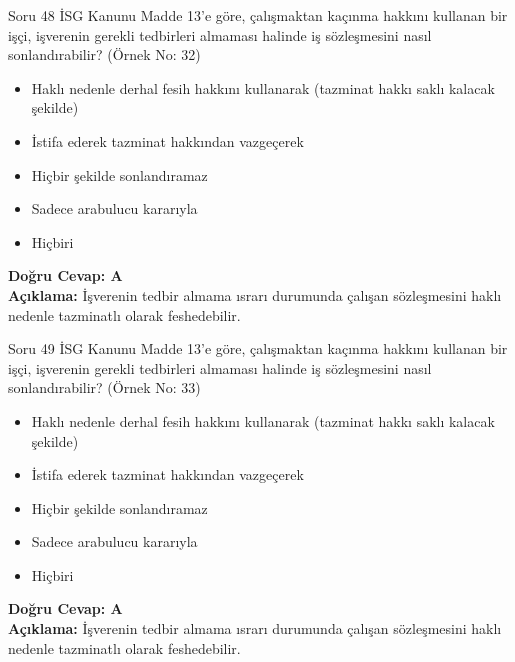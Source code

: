 \documentclass[12pt,a4paper]{article}
\begin{document}
\begin{testcard}{Soru 48}
    İSG Kanunu Madde 13'e göre, çalışmaktan kaçınma hakkını kullanan bir işçi, işverenin gerekli tedbirleri almaması halinde iş sözleşmesini nasıl sonlandırabilir? (Örnek No: 32)
    \begin{itemize}
        \item[A)] Haklı nedenle derhal fesih hakkını kullanarak (tazminat hakkı saklı kalacak şekilde)
        \item[B)] İstifa ederek tazminat hakkından vazgeçerek
        \item[C)] Hiçbir şekilde sonlandıramaz
        \item[D)] Sadece arabulucu kararıyla
        \item[E)] Hiçbiri
    \end{itemize}
    \tcblower
    \textbf{Doğru Cevap: A} \\
    \textbf{Açıklama:} İşverenin tedbir almama ısrarı durumunda çalışan sözleşmesini haklı nedenle tazminatlı olarak feshedebilir.
\end{testcard}

\begin{testcard}{Soru 49}
    İSG Kanunu Madde 13'e göre, çalışmaktan kaçınma hakkını kullanan bir işçi, işverenin gerekli tedbirleri almaması halinde iş sözleşmesini nasıl sonlandırabilir? (Örnek No: 33)
    \begin{itemize}
        \item[A)] Haklı nedenle derhal fesih hakkını kullanarak (tazminat hakkı saklı kalacak şekilde)
        \item[B)] İstifa ederek tazminat hakkından vazgeçerek
        \item[C)] Hiçbir şekilde sonlandıramaz
        \item[D)] Sadece arabulucu kararıyla
        \item[E)] Hiçbiri
    \end{itemize}
    \tcblower
    \textbf{Doğru Cevap: A} \\
    \textbf{Açıklama:} İşverenin tedbir almama ısrarı durumunda çalışan sözleşmesini haklı nedenle tazminatlı olarak feshedebilir.
\end{testcard}
\end{document}
